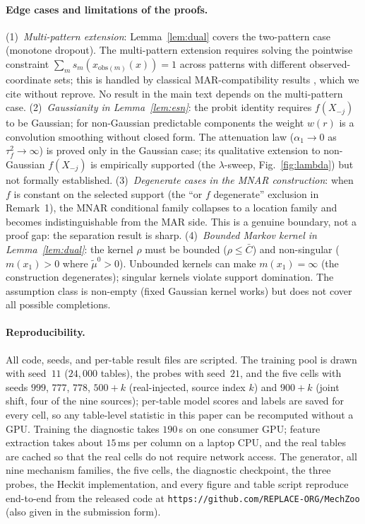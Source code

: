 \documentclass[conference]{IEEEtran}
\begin{document}
\paragraph{Edge cases and limitations of the proofs.}
(1)~\emph{Multi-pattern extension}: Lemma~\ref{lem:dual} covers the two-pattern case
(monotone dropout). The multi-pattern extension requires solving the pointwise constraint
$\sum_m s_m(x_{\mathrm{obs}(m)}(x))=1$ across patterns with different observed-coordinate
sets; this is handled by classical MAR-compatibility results
\cite{rubin1976,mk2007,seaman2013}, which we cite without reprove. No result in the main
text depends on the multi-pattern case. (2)~\emph{Gaussianity in Lemma~\ref{lem:esn}}:
the probit identity requires $f(X_{-j})$ to be Gaussian; for non-Gaussian predictable
components the weight $w(r)$ is a convolution smoothing without closed form. The
attenuation law ($\alpha_1\to0$ as $\tau_f^2\to\infty$) is proved only in the Gaussian
case; its qualitative extension to non-Gaussian $f(X_{-j})$ is empirically supported
(the $\lambda$-sweep, Fig.~\ref{fig:lambda}) but not formally established.
(3)~\emph{Degenerate cases in the MNAR construction}: when $f$ is constant on the
selected support (the ``or $f$ degenerate'' exclusion in Remark~1), the MNAR conditional
family collapses to a location family and becomes indistinguishable from the MAR side.
This is a genuine boundary, not a proof gap: the separation result is sharp.
(4)~\emph{Bounded Markov kernel in Lemma~\ref{lem:dual}}: the kernel $\rho$ must be
bounded ($\rho\le\bar C$) and non-singular ($m(x_1)>0$ where $\tilde\mu^0>0$). Unbounded
kernels can make $m(x_1)=\infty$ (the construction degenerates); singular kernels violate
support domination. The assumption class is non-empty (fixed Gaussian kernel works) but
does not cover all possible completions.

\paragraph{Reproducibility.} All code, seeds, and per-table result files are scripted. The
training pool is drawn with seed~$11$ ($24{,}000$ tables), the probes with seed~$21$, and the
five cells with seeds $999$, $777$, $778$, $500{+}k$ (real-injected, source index $k$) and
$900{+}k$ (joint shift, four of the nine sources); per-table model scores and labels are saved
for every cell, so any table-level statistic in this paper can be recomputed without a GPU.
Training the diagnostic takes $190$\,s on one consumer GPU; feature extraction takes about
$15$\,ms per column on a laptop CPU, and the real tables are cached so that the real cells do
not require network access. The generator, all nine mechanism families, the five cells, the
diagnostic checkpoint, the three probes, the Heckit implementation, and every figure and table
script reproduce end-to-end from the released code at
\texttt{https://github.com/REPLACE-ORG/MechZoo} (also given in the submission form).
\end{document}
